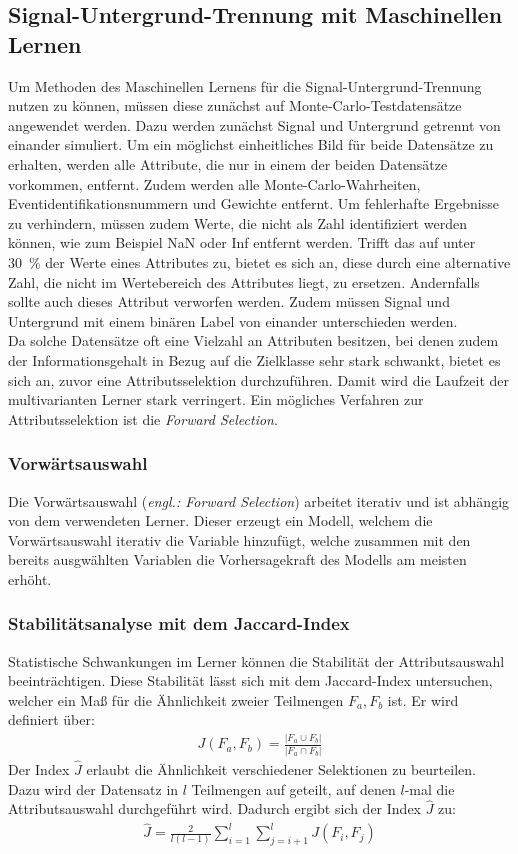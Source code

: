 \subsection{Signal-Untergrund-Trennung mit Maschinellen Lernen}
\label{Signal}
Um Methoden des Maschinellen Lernens für die Signal-Untergrund-Trennung nutzen zu können, müssen diese zunächst auf Monte-Carlo-Testdatensätze angewendet werden. Dazu werden zunächst Signal und Untergrund getrennt von einander simuliert. Um ein möglichst einheitliches Bild für beide Datensätze zu erhalten, werden alle Attribute, die nur in einem der beiden Datensätze vorkommen, entfernt. Zudem werden alle Monte-Carlo-Wahrheiten, Eventidentifikationsnummern und Gewichte entfernt. Um fehlerhafte Ergebnisse zu verhindern, müssen zudem Werte, die nicht als Zahl identifiziert werden können, wie zum Beispiel NaN oder Inf entfernt werden. Trifft das auf unter \SI{30}{\percent} der Werte eines Attributes zu, bietet es sich an, diese durch eine alternative Zahl, die nicht im Wertebereich des Attributes liegt, zu ersetzen. Andernfalls sollte auch dieses Attribut verworfen werden. Zudem müssen Signal und Untergrund mit einem binären Label von einander unterschieden werden.\\
Da solche Datensätze oft eine Vielzahl an Attributen besitzen, bei denen zudem der Informationsgehalt in Bezug auf die Zielklasse sehr stark schwankt, bietet es sich an, zuvor eine Attributsselektion durchzuführen. Damit wird die Laufzeit der multivarianten Lerner stark verringert. Ein mögliches Verfahren zur Attributsselektion ist die \textit{Forward Selection}.
\subsubsection{Vorwärtsauswahl}
Die Vorwärtsauswahl (\textit{engl.: Forward Selection}) arbeitet iterativ und ist abhängig von dem verwendeten Lerner. Dieser erzeugt ein Modell, welchem die Vorwärtsauswahl iterativ die Variable hinzufügt, welche zusammen mit den bereits ausgwählten Variablen die Vorhersagekraft des Modells am meisten erhöht.
\subsubsection{Stabilitätsanalyse mit dem Jaccard-Index}
Statistische Schwankungen im Lerner können die Stabilität der Attributsauswahl beeinträchtigen. Diese Stabilität lässt sich mit dem Jaccard-Index untersuchen, welcher ein Maß für die Ähnlichkeit zweier Teilmengen $F_{a},F_{b}$ ist. Er wird definiert über:
\begin{align}
	J(F_{a},F_{b}) = \frac{|F_{a} \cup F_{b}|}{|F_{a} \cap F_{b}|}
\end{align}
Der Index $\hat{J}$ erlaubt die Ähnlichkeit verschiedener Selektionen zu beurteilen. Dazu wird der Datensatz in $l$ Teilmengen auf geteilt, auf denen $l$-mal die Attributsauswahl durchgeführt wird. Dadurch ergibt sich der Index $\hat{J}$ zu:
\begin{align}
	\hat{J} = \frac{2}{l(l-1)} \sum^{l}_{i=1} \sum^{l}_{j=i+1} J(F_{i},F_{j})
	\label{eq:jc}
\end{align}

